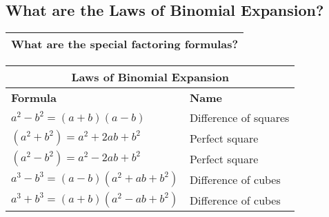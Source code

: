 \subsection{What are the Laws of Binomial Expansion?}

\begin{small}
    \begin{tabularx}{1\textwidth}{
            p{}
        }
        \toprule
        What are the special factoring formulas?
        \\
        \bottomrule

    \end{tabularx}
\end{small}
\begin{small}
    \begin{tabularx}{1\textwidth}{
            p{}
            p{}
        }
        \toprule
        \multicolumn{2}{c}{\textbf{Laws of Binomial Expansion}} \\
        \midrule

        \textbf{Formula} & \textbf{Name}\\
        \midrule

        $ a^{2} - b^{2} = \left(a + b \right)\left(a - b \right) $
        &
        Difference of squares
        \\
        \midrule

        $ \left(a^{2} + b^{2}\right) = a^{2} + 2ab + b^{2} $
        &
        Perfect square
        \\
        \midrule
        
        $ \left(a^{2} - b^{2}\right) = a^{2} - 2ab + b^{2} $
        &
        Perfect square
        \\
        \midrule

        $ a^{3} - b^{3} = \left(a - b \right)\left(a^{2} + ab +  b^{2} \right) $
        &
        Difference of cubes
        \\
        \midrule

        $ a^{3} + b^{3} = \left(a + b \right)\left(a^{2} - ab +  b^{2} \right) $
        &
        Difference of cubes
        \\
        \bottomrule
    \end{tabularx}
\end{small}

